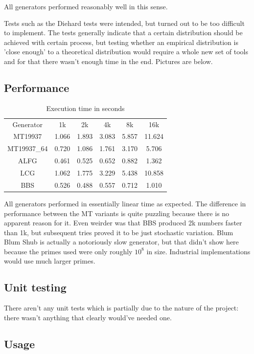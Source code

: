 \documentclass[reprint,aip]{revtex4-1}
\begin{document}
All generators performed reasonably well in this sense.

Tests such as the Diehard tests were intended, but turned out to be too difficult to implement. The tests generally indicate that a certain distribution should be achieved with certain process, but testing whether an empirical distribution is 'close enough' to a theoretical distribution would require a whole new set of tools and for that there wasn't enough time in the end. Pictures are below.

\subsection{Performance}

\begin{table}[h!]
\begin{tabular}{c|c|c|c|c|c}
Generator & 1k & 2k & 4k & 8k & 16k \\
MT19937 & 1.066 & 1.893 & 3.083 & 5.857 & 11.624 \\
MT19937\_64 & 0.720 & 1.086 & 1.761 & 3.170 & 5.706 \\
ALFG & 0.461 & 0.525 & 0.652 & 0.882 & 1.362 \\
LCG & 1.062 & 1.775 & 3.229 & 5.438 & 10.858 \\
BBS & 0.526 & 0.488 & 0.557 & 0.712 & 1.010 \\
\end{tabular}
\caption{Execution time in seconds}
\end{table}

All generators performed in essentially linear time as expected. The difference in performance between the MT variants is quite puzzling because there is no apparent reason for it. Even weirder was that BBS produced 2k numbers faster than 1k, but subsequent tries proved it to be just stochastic variation. Blum Blum Shub is actually a notoriously slow generator, but that didn't show here because the primes used were only roughly $10^8$ in size. Industrial implementations would use much larger primes.

\subsection{Unit testing}

There aren't any unit tests which is partially due to the nature of the project: there wasn't anything that clearly would've needed one.

\subsection{Usage}
\end{document}
